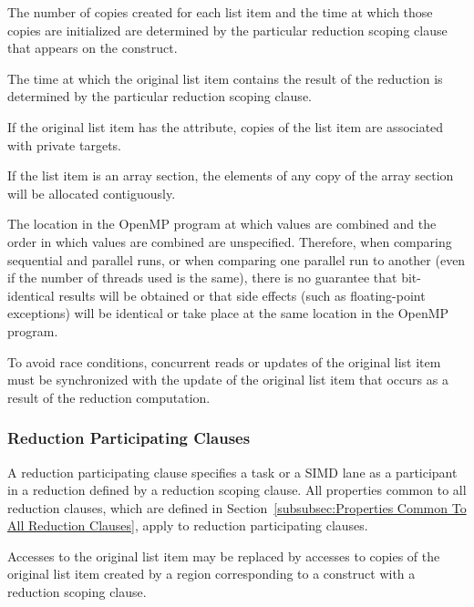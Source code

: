 The number of copies created for each list item and the time at which those
copies are initialized are determined by the particular reduction scoping clause
that appears on the construct.

The time at which the original list item contains the result of the reduction
is determined by the particular reduction scoping clause.

\begin{samepage}
\begin{fortranspecific}
If the original list item has the  attribute, copies of
the list item are associated with private targets.
\end{fortranspecific}
\end{samepage}

If the list item is an array section, the elements of any copy of the array section will
be allocated contiguously.

The location in the OpenMP program at which values are combined and the
order in which values are combined are unspecified. Therefore, when
comparing sequential and parallel runs, or when comparing one parallel run to
another (even if the number of threads used is the same), there is no guarantee
that bit-identical results will be obtained or that side effects (such as
floating-point exceptions) will be identical or take place at the same location
in the OpenMP program.

To avoid race conditions, concurrent reads or updates of the original list item
must be synchronized with the update of the original list item that occurs as a
result of the reduction computation.










\subsubsection{Reduction Participating Clauses}
\label{subsubsec:Reduction Participating Clauses}
A reduction participating clause specifies a task or a SIMD lane as a
participant in a reduction defined by a reduction scoping clause.
All properties common to all reduction clauses, which are defined in
Section~\ref{subsubsec:Properties Common To All Reduction Clauses}, apply to
reduction participating clauses.

Accesses to the original list item may be replaced by accesses to copies of the
original list item created by a region corresponding to a construct with a
reduction scoping clause.

